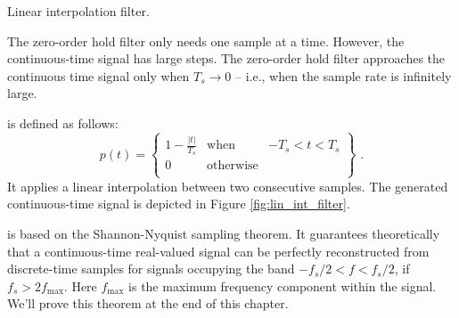 \begin{marginfigure}
\begin{center}
\end{center}
\caption{Linear interpolation filter.}
\label{fig:lin_int_filter}
\end{marginfigure}

The zero-order hold filter only needs one sample at a time. However, the continuous-time signal has large steps. 
The zero-order hold filter approaches the continuous time signal only when $T_s\rightarrow 0$ -- i.e., when the sample rate is infinitely large.

 is defined as follows:
\begin{equation}
p(t) = \left\{
  \begin{array}{rcr}
    1-\frac{|t|}{T_s} & \mathrm{when} & -T_s < t < T_s \\
    0 & \mathrm{otherwise} & \\
  \end{array}
\right\} \,\,.
\end{equation}
It applies a linear interpolation between two consecutive samples. The generated continuous-time signal is depicted in Figure \ref{fig:lin_int_filter}.

 is based on the
Shannon-Nyquist sampling theorem. It guarantees theoretically that a continuous-time real-valued signal can be perfectly reconstructed from discrete-time samples for 
signals occupying the band $-f_s/2 < f < f_s/2$, if $f_s > 2f_{\mathrm{max}}$. 
Here $f_{\mathrm{max}}$ is the maximum frequency component within the signal. We'll prove this theorem at the end of this chapter.


